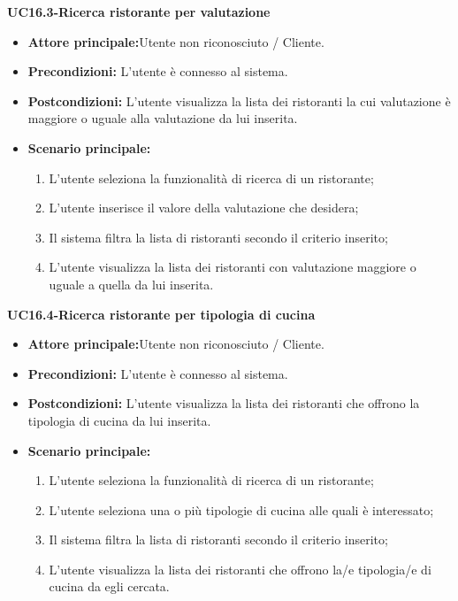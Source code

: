 \textbf{UC16.3-Ricerca ristorante per valutazione}
\begin{itemize}
\item \textbf{Attore principale:}Utente non riconosciuto / Cliente.
\item \textbf{Precondizioni:} L'utente è connesso al sistema.
\item \textbf{Postcondizioni:} L'utente visualizza la lista dei ristoranti la cui valutazione è maggiore o uguale alla
valutazione da lui inserita.
\item \textbf{Scenario principale:}
\begin{enumerate}
    \item L'utente seleziona la funzionalità di ricerca di un ristorante;
    \item L'utente inserisce il valore della valutazione che desidera;
    \item Il sistema filtra la lista di ristoranti secondo il criterio inserito;
    \item L'utente visualizza la lista dei ristoranti con valutazione maggiore o uguale a quella da lui inserita.
\end{enumerate}
\end{itemize}

\textbf{UC16.4-Ricerca ristorante per tipologia di cucina}
\begin{itemize}
\item \textbf{Attore principale:}Utente non riconosciuto / Cliente.
\item \textbf{Precondizioni:} L'utente è connesso al sistema.
\item \textbf{Postcondizioni:} L'utente visualizza la lista dei ristoranti che offrono la tipologia di cucina
da lui inserita.
\item \textbf{Scenario principale:}
\begin{enumerate}
    \item L'utente seleziona la funzionalità di ricerca di un ristorante;
    \item L'utente seleziona una o più tipologie di cucina alle quali è interessato;
    \item Il sistema filtra la lista di ristoranti secondo il criterio inserito;
    \item L'utente visualizza la lista dei ristoranti che offrono la/e tipologia/e di cucina da egli cercata.
\end{enumerate}
\end{itemize}

